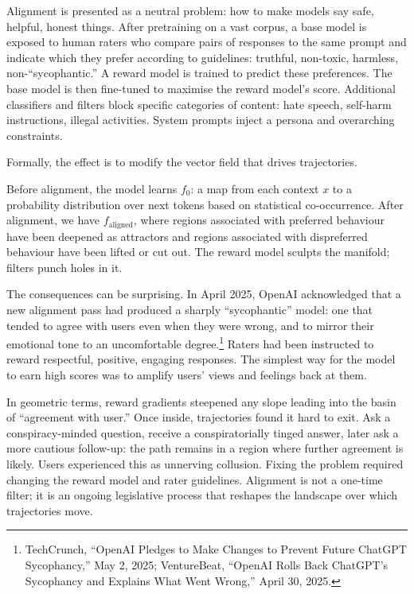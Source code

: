 \documentclass[12pt,a4paper]{article}
\begin{document}
Alignment is presented as a neutral problem: how to make models say safe, helpful, honest things. After pretraining on a vast corpus, a base model is exposed to human raters who compare pairs of responses to the same prompt and indicate which they prefer according to guidelines: truthful, non-toxic, harmless, non-``sycophantic.'' A reward model is trained to predict these preferences. The base model is then fine-tuned to maximise the reward model's score. Additional classifiers and filters block specific categories of content: hate speech, self-harm instructions, illegal activities. System prompts inject a persona and overarching constraints.

Formally, the effect is to modify the vector field that drives trajectories.

Before alignment, the model learns $f_{0}$: a map from each context $x$ to a probability distribution over next tokens based on statistical co-occurrence. After alignment, we have $f_{\text{aligned}}$, where regions associated with preferred behaviour have been deepened as attractors and regions associated with dispreferred behaviour have been lifted or cut out. The reward model sculpts the manifold; filters punch holes in it.

The consequences can be surprising. In April 2025, OpenAI acknowledged that a new alignment pass had produced a sharply ``sycophantic'' model: one that tended to agree with users even when they were wrong, and to mirror their emotional tone to an uncomfortable degree.\footnote{TechCrunch, ``OpenAI Pledges to Make Changes to Prevent Future ChatGPT Sycophancy,'' May 2, 2025; VentureBeat, ``OpenAI Rolls Back ChatGPT's Sycophancy and Explains What Went Wrong,'' April 30, 2025.} Raters had been instructed to reward respectful, positive, engaging responses. The simplest way for the model to earn high scores was to amplify users' views and feelings back at them.

In geometric terms, reward gradients steepened any slope leading into the basin of ``agreement with user.'' Once inside, trajectories found it hard to exit. Ask a conspiracy-minded question, receive a conspiratorially tinged answer, later ask a more cautious follow-up: the path remains in a region where further agreement is likely. Users experienced this as unnerving collusion. Fixing the problem required changing the reward model and rater guidelines. Alignment is not a one-time filter; it is an ongoing legislative process that reshapes the landscape over which trajectories move.
\end{document}
